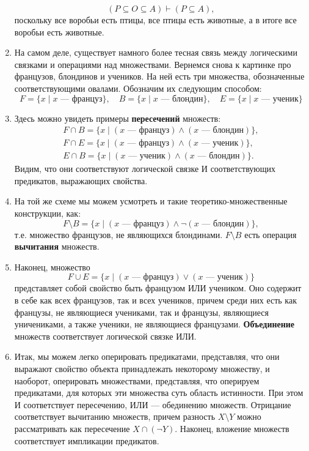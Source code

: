 \begin{enumerate}
$$
(P\subseteq O\subseteq A) \vdash (P\subseteq A),
$$
поскольку все воробьи есть птицы, все птицы есть животные, а в итоге все воробьи есть животные.
\item На самом деле, существует намного более тесная связь между логическими связками и операциями над множествами.
Вернемся снова к картинке про французов, блондинов и учеников. На ней есть три множества, обозначенные соответствующими овалами. Обозначим их следующим способом:
$$
F = \{x\mid x\mbox{ --- француз}\},\quad B = \{x\mid x\mbox{ --- блондин}\},\quad E = \{x\mid x\mbox{ --- ученик}\}
$$
\item Здесь можно увидеть примеры \textbf{пересечений} множеств:
\begin{gather*}
F\cap B = \{x\mid (x\mbox{ --- француз})\land (x\mbox{ --- блондин})\},\\
F\cap E = \{x\mid (x\mbox{ --- француз})\land (x\mbox{ --- ученик})\},\\
E\cap B = \{x\mid (x\mbox{ --- ученик})\land (x\mbox{ --- блондин})\}.
\end{gather*}
Видим, что они соответствуют логической связке И соответствующих предикатов, выражающих свойства.
\item На той же схеме мы можем усмотреть и такие теоретико-множественные конструкции, как:
$$
F\setminus B = \{x\mid (x\mbox{ --- француз})\land \neg(x\mbox{ --- блондин})\},
$$
т.е. множество французов, не являющихся блондинами. $F\setminus B$ есть операция \textbf{вычитания} множеств.
\item Наконец, множество 
$$
F\cup E  = \{x\mid (x\mbox{ --- француз})\lor (x\mbox{ --- ученик})\}
$$
представляет собой свойство быть французом ИЛИ учеником. Оно содержит в себе как всех французов, так и всех учеников, причем среди них есть как французы, не являющиеся учениками, так и французы, являющиеся уничениками, а также ученики, не являющиеся французами. \textbf{Объединение} множеств соответствует логической связке ИЛИ.
\item Итак, мы можем легко оперировать предикатами, представляя, что они выражают свойство объекта принадлежать некоторому множеству, и наоборот, оперировать множествами, представляя, что оперируем предикатами, для которых эти множества суть область истинности. При этом И соответствует пересечению, ИЛИ --- обединению множеств. Отрицание соответствует вычитанию множеств, причем разность $X\setminus Y$ можно рассматривать как пересечение $X\cap(\neg Y)$. Наконец, вложение множеств соответствует импликации предикатов.
\end{enumerate}



